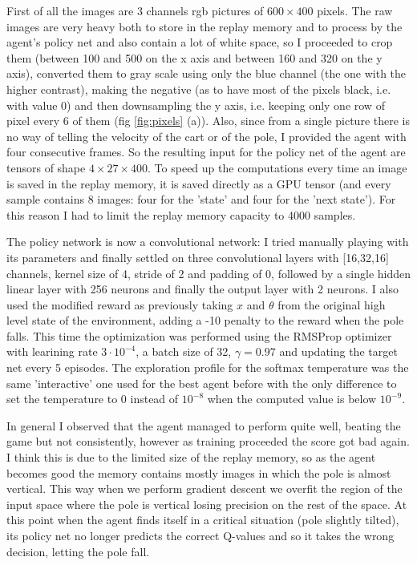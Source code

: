 \documentclass[a4paper, 11pt]{article}
\begin{document}
  First of all the images are 3 channels rgb pictures of $600 \times 400$ pixels. The raw images are very heavy both to store in the replay memory and to process by the agent's policy net and also contain a lot of white space, so I proceeded to crop them (between 100 and 500 on the x axis and between 160 and 320 on the y axis), converted them to gray scale using only the blue channel (the one with the higher contrast), making the negative (as to have most of the pixels black, i.e. with value 0) and then downsampling the y axis, i.e. keeping only one row of pixel every 6 of them (fig \ref{fig:pixels} (a)).
  Also, since from a single picture there is no way of telling the velocity of the cart or of the pole, I provided the agent with four consecutive frames. So the resulting input for the policy net of the agent are tensors of shape $4 \times 27 \times 400$. To speed up the computations every time an image is saved in the replay memory, it is saved directly as a GPU tensor (and every sample contains 8 images: four for the 'state' and four for the 'next state'). For this reason I had to limit the replay memory capacity to 4000 samples.

  The policy network is now a convolutional network: I tried manually playing with its parameters and finally settled on three convolutional layers with [16,32,16] channels, kernel size of 4, stride of 2 and padding of 0, followed by a single hidden linear layer with 256 neurons and finally the output layer with 2 neurons. I also used the modified reward as previously taking $x$ and  $\theta$ from the original high level state of the environment, adding a -10 penalty to the reward when the pole falls. This time the optimization was performed using the RMSProp optimizer with learining rate $3\cdot10^{-4}$, a batch size of 32, $\gamma=0.97$ and updating the target net every 5 episodes. The exploration profile for the softmax temperature was the same 'interactive' one used for the best agent before with the only difference to set the temperature to 0 instead of $10^{-8}$ when the computed value is below $10^{-9}$.

  In general I observed that the agent managed to perform quite well, beating the game but not consistently, however as training proceeded the score got bad again. I think this is due to the limited size of the replay memory, so as the agent becomes good the memory contains mostly images in which the pole is almost vertical. This way when we perform gradient descent we overfit the region of the input space where the pole is vertical losing precision on the rest of the space. At this point when the agent finds itself in a critical situation (pole slightly tilted), its policy net no longer predicts the correct Q-values and so it takes the wrong decision, letting the pole fall.
\end{document}
